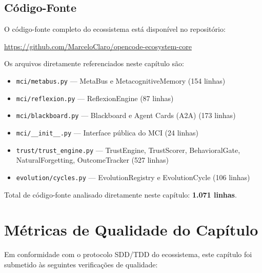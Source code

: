 \subsection*{Código-Fonte}

O código-fonte completo do ecossistema está disponível no repositório:

\begin{center}
\url{https://github.com/MarceloClaro/opencode-ecosystem-core}
\end{center}

Os arquivos diretamente referenciados neste capítulo são:

\begin{itemize}
    \item \texttt{mci/metabus.py} — MetaBus e MetacognitiveMemory (154 linhas)
    \item \texttt{mci/reflexion.py} — ReflexionEngine (87 linhas)
    \item \texttt{mci/blackboard.py} — Blackboard e Agent Cards (A2A) (173 linhas)
    \item \texttt{mci/__init__.py} — Interface pública do MCI (24 linhas)
    \item \texttt{trust/trust\_engine.py} — TrustEngine, TrustScorer, BehavioralGate, NaturalForgetting, OutcomeTracker (527 linhas)
    \item \texttt{evolution/cycles.py} — EvolutionRegistry e EvolutionCycle (106 linhas)
\end{itemize}

Total de código-fonte analisado diretamente neste capítulo: \textbf{1.071 linhas}.

\section{Métricas de Qualidade do Capítulo}
\label{sec:quality-metrics}

Em conformidade com o protocolo SDD/TDD do ecossistema, este capítulo foi submetido às seguintes verificações de qualidade:

